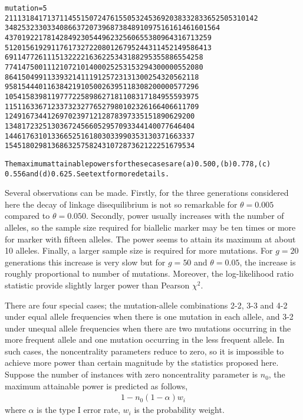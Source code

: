 \begin{alltt}
mutation=5
2  1113 1841  7137 11455  1507 2476 155053 245369  2038 3328  3365250 5310142
3   482  532  3303  3408   663  720  73968  73848   910  975  1616146 1601564
4   370  192  2178  1428   492  305  44962  32560   655  380   964316  713259
5   120  156  1929  1176   173  272  20801  26795   244  311   452149  586413
6    91  147   726  1115   132  222  16362  25343   188  295   355886  554258
7    74  147   500  1112   107  210  14000  25253   153  294   300000  552080
8    64  150   499  1133    93  214  11191  25723   131  300   254320  562118
9    58  154   440  1163    84  219  10500  26395   118  308   200000  577296
10   54  158   398  1197    77  225   8986  27181   108  317   184955  593975
11   51  163   367  1233    73  232   7765  27980   102  326   166406  611709
12   49  167   344  1269    70  239   7121  28783    97  335   151890  629200
13   48  172   325  1303    67  245   6605  29570    93  344   140077  646404
14   46  176   310  1336    65  251   6180  30339    90  353   130371  663337
15   45  180   298  1368    63  257   5824  31072    87  362   122251  679534

The maximum attainable powers for these cases are (a) 0.500, (b) 0.778, (c)
0.556 and (d) 0.625. See text for more details.
\end{alltt}

Several observations can be made.  Firstly, for the three generations
considered here the decay of linkage disequilibrium is not so remarkable for
$\theta=0.005$ compared to $\theta=0.050$.  Secondly, power usually increases
with the number of alleles, so the sample size required for biallelic marker
may be ten times or more for marker with fifteen alleles.  The power seems to
attain its maximum at about 10 alleles.  Finally, a larger sample size is
required for more mutations.  For $g=20$ generations this increase is very slow
but for $g=50$ and $\theta=0.05$, the increase is roughly proportional to
number of mutations.  Moreover, the log-likelihood ratio statistic provide
slightly larger power than Pearson $\chi^2$.

There are four special cases; the mutation-allele combinations 2-2, 3-3 and 4-2
under equal allele frequencies when there is one mutation in each allele, and
3-2 under unequal allele frequencies when there are two mutations occurring in
the more frequent allele and one mutation occurring in the less frequent
allele.  In such cases, the noncentrality parameters reduce to zero, so it is
impossible to achieve more power than certain magnitude by the statistics
proposed here.  Suppose the number of instances with zero noncentrality
parameter is $n_0$, the maximum attainable power is predicted as follows,
\begin{eqnarray}
1-n_0(1-\alpha)w_i\label{eqn4}
\end{eqnarray}
where $\alpha$ is the type I error rate, $w_i$ is the probability weight.


